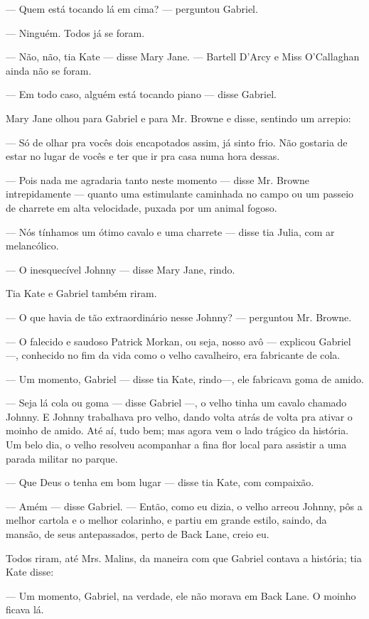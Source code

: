 --- Quem está tocando lá em cima? --- perguntou Gabriel.

--- Ninguém. Todos já se foram.

--- Não, não, tia Kate --- disse Mary Jane. --- Bartell D'Arcy e Miss
O'Callaghan ainda não se foram.

--- Em todo caso, alguém está tocando piano --- disse Gabriel.

Mary Jane olhou para Gabriel e para Mr. Browne e disse, sentindo um
arrepio:

--- Só de olhar pra vocês dois encapotados assim, já sinto frio. Não
gostaria de estar no lugar de vocês e ter que ir pra casa numa hora
dessas.

--- Pois nada me agradaria tanto neste momento --- disse Mr. Browne
intrepidamente --- quanto uma estimulante caminhada no campo ou um
passeio de charrete em alta velocidade, puxada por um animal fogoso.

--- Nós tínhamos um ótimo cavalo e uma charrete --- disse tia Julia,
com ar melancólico.

--- O inesquecível Johnny --- disse Mary Jane, rindo.

Tia Kate e Gabriel também riram.

--- O que havia de tão extraordinário nesse Johnny? --- perguntou Mr.
Browne.

--- O falecido e saudoso Patrick Morkan, ou seja, nosso avô ---
explicou Gabriel ---, conhecido no fim da vida como o velho
cavalheiro, era fabricante de cola.

--- Um momento, Gabriel --- disse tia Kate, rindo---, ele fabricava
goma de amido.

--- Seja lá cola ou goma --- disse Gabriel ---, o velho tinha um
cavalo chamado Johnny. E Johnny trabalhava pro velho, dando volta
atrás de volta pra ativar o moinho de amido. Até aí, tudo bem; mas
agora vem o lado trágico da história. Um belo dia, o velho resolveu
acompanhar a fina flor local para assistir a uma parada militar no
parque.

--- Que Deus o tenha em bom lugar --- disse tia Kate, com compaixão.

--- Amém --- disse Gabriel. --- Então, como eu dizia, o velho arreou
Johnny, pôs a melhor cartola e o melhor colarinho, e partiu em grande
estilo, saindo, da mansão, de seus antepassados, perto de Back Lane,
creio eu.

Todos riram, até Mrs. Malins, da maneira com que Gabriel contava a
história; tia Kate disse:

--- Um momento, Gabriel, na verdade, ele não morava em Back Lane. O
moinho ficava lá.

